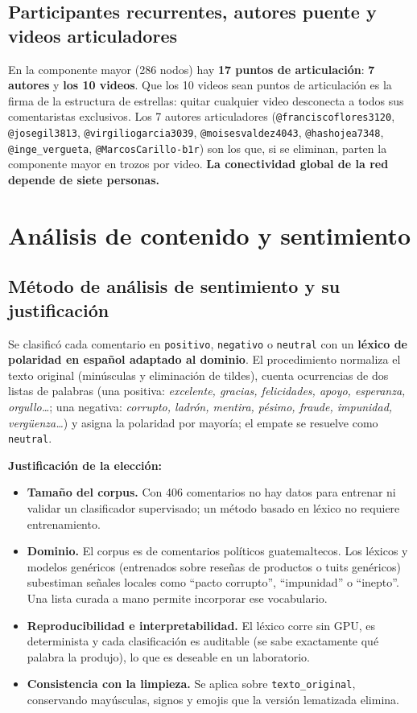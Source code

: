 \documentclass[11pt,a4paper]{article}
\begin{document}
\subsection{Participantes recurrentes, autores puente y videos articuladores}
En la componente mayor (286 nodos) hay \textbf{17 puntos de articulaci\'on}: \textbf{7 autores} y
\textbf{los 10 videos}. Que los 10 videos sean puntos de articulaci\'on es la firma de la estructura
de estrellas: quitar cualquier video desconecta a todos sus comentaristas exclusivos. Los 7 autores
articuladores (\texttt{@franciscoflores3120}, \texttt{@josegil3813}, \texttt{@virgiliogarcia3039},
\texttt{@moisesvaldez4043}, \texttt{@hashojea7348}, \texttt{@inge\_vergueta},
\texttt{@MarcosCarillo-b1r}) son los que, si se eliminan, parten la componente mayor en trozos por
video. \textbf{La conectividad global de la red depende de siete personas.}

\section{An\'alisis de contenido y sentimiento}
\label{sec:sentimiento}

\subsection{M\'etodo de an\'alisis de sentimiento y su justificaci\'on}
Se clasific\'o cada comentario en \texttt{positivo}, \texttt{negativo} o \texttt{neutral} con un
\textbf{l\'exico de polaridad en espa\~nol adaptado al dominio}. El procedimiento normaliza el texto
original (min\'usculas y eliminaci\'on de tildes), cuenta ocurrencias de dos listas de palabras
(una positiva: \emph{excelente, gracias, felicidades, apoyo, esperanza, orgullo\dots}; una negativa:
\emph{corrupto, ladr\'on, mentira, p\'esimo, fraude, impunidad, verg\"uenza\dots}) y asigna la
polaridad por mayor\'ia; el empate se resuelve como \texttt{neutral}.

\textbf{Justificaci\'on de la elecci\'on:}
\begin{itemize}[leftmargin=1.4em,itemsep=2pt]
\item \textbf{Tama\~no del corpus.} Con 406 comentarios no hay datos para entrenar ni validar un
clasificador supervisado; un m\'etodo basado en l\'exico no requiere entrenamiento.
\item \textbf{Dominio.} El corpus es de comentarios pol\'iticos guatemaltecos. Los l\'exicos y modelos
gen\'ericos (entrenados sobre rese\~nas de productos o tuits gen\'ericos) subestiman se\~nales
locales como ``pacto corrupto'', ``impunidad'' o ``inepto''. Una lista curada a mano permite incorporar
ese vocabulario.
\item \textbf{Reproducibilidad e interpretabilidad.} El l\'exico corre sin GPU, es determinista y cada
clasificaci\'on es auditable (se sabe exactamente qu\'e palabra la produjo), lo que es deseable en un
laboratorio.
\item \textbf{Consistencia con la limpieza.} Se aplica sobre \texttt{texto\_original}, conservando
may\'usculas, signos y emojis que la versi\'on lematizada elimina.
\end{itemize}
\end{document}
